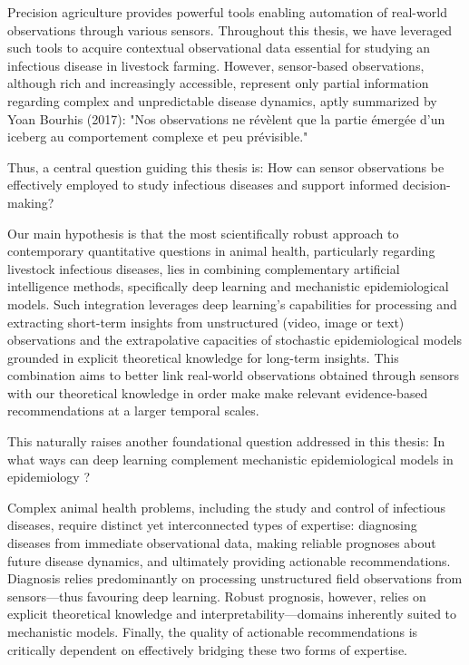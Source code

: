 




Precision agriculture provides powerful tools enabling automation of real-world observations through various sensors. Throughout this thesis, we have leveraged such tools to acquire contextual observational data essential for studying an infectious disease in livestock farming. However, sensor-based observations, although rich and increasingly accessible, represent only partial information regarding complex and unpredictable disease dynamics, aptly summarized by Yoan Bourhis (2017): "Nos observations ne révèlent que la partie émergée d’un iceberg au comportement complexe et peu prévisible."

Thus, a central question guiding this thesis is: How can sensor observations be effectively employed to study infectious diseases and support informed decision-making?

Our main hypothesis is that the most scientifically robust approach to contemporary quantitative questions in animal health, particularly regarding livestock infectious diseases, lies in combining complementary artificial intelligence methods, specifically deep learning and mechanistic epidemiological models. Such integration leverages deep learning’s capabilities for processing and extracting short-term insights from unstructured (video, image or text) observations  and the extrapolative capacities of stochastic epidemiological models grounded in explicit theoretical knowledge for long-term insights. This combination aims to better link real-world observations obtained through sensors with our theoretical knowledge in order make make relevant evidence-based recommendations at a larger temporal scales.

This naturally raises another foundational question addressed in this thesis:
In what ways can deep learning complement mechanistic epidemiological models in epidemiology ?

Complex animal health problems, including the study and control of infectious diseases, require distinct yet interconnected types of expertise: diagnosing diseases from immediate observational data, making reliable prognoses about future disease dynamics, and ultimately providing actionable recommendations. Diagnosis relies predominantly on processing unstructured field observations from sensors—thus favouring deep learning. Robust prognosis, however, relies on explicit theoretical knowledge and interpretability—domains inherently suited to mechanistic models. Finally, the quality of actionable recommendations is critically dependent on effectively bridging these two forms of expertise.

